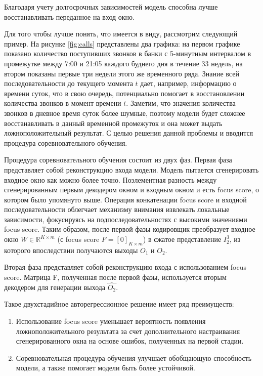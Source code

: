 \documentclass{article}
\begin{document}
Благодаря учету долгосрочных зависимостей модель способна лучше восстанавливать переданное на вход окно. 

Для того чтобы лучше понять, что имеется в виду, рассмотрим следующий пример. На рисунке \ref{fig:calls} представлены два графика: на первом графике показано количество поступивших звонков в банки с 5-минутным интервалом в промежутке между 7:00 и 21:05 каждого буднего дня в течение 33 недель, на втором показаны первые три недели этого же временного ряда. Знание всей последовательности до текущего момента $t$ дает, например, информацию о времени суток, что в свою очередь, потенциально помогает в восстановлении количества звонков в момент времени $t$. Заметим, что значения количества звонков в дневное время суток более шумные, поэтому модели будет сложнее восстанавливать в данный временной промежуток и она может выдать ложноположительный результат. С целью решения данной проблемы и вводится процедура соревновательного обучения. 


Процедура соревновательного обучения состоит из двух фаз. Первая фаза представляет собой реконструкцию входа модели. Модель пытается сгенерировать входное окно как можно более точно. Поэлементная разность между сгенерированным первым декодером окном и входным окном и есть focus score, о котором было упомянуто выше. Операция конкатенации focus score и входной последовательности облегчает механизму внимания извлекать локальные зависимости, фокусируясь на подпоследовательностях с высокими значениями focus score.  Таким образом, после первой фазы кодировщик преобразует входное окно $W \in \mathbb{R}^{K \times m}$ (с focus score $F = [0]_{K \times m}$) в сжатое представление $I_2^3$, из которого впоследствии получаются выходы $O_1$ и $O_2$. 

Вторая фаза представляет собой реконструкцию входа с использованием focus score. Матрица F, полученная после первой фазы, используется вторым декодером для генерации выхода $\hat{O_2}$. 

Такое двухстадийное авторегрессионное решение имеет ряд преимуществ: 
\begin{enumerate}
    \item Использование focus score уменьшает вероятность появления ложноположительного результата за счет дополнительного настраивания сгенерированного окна на основе ошибок, полученных на первой стадии. 

    \item Соревновательная процедура обучения улучшает обобщающую способность модели, а также помогает модели быть более устойчивой. 
\end{enumerate}
\end{document}
